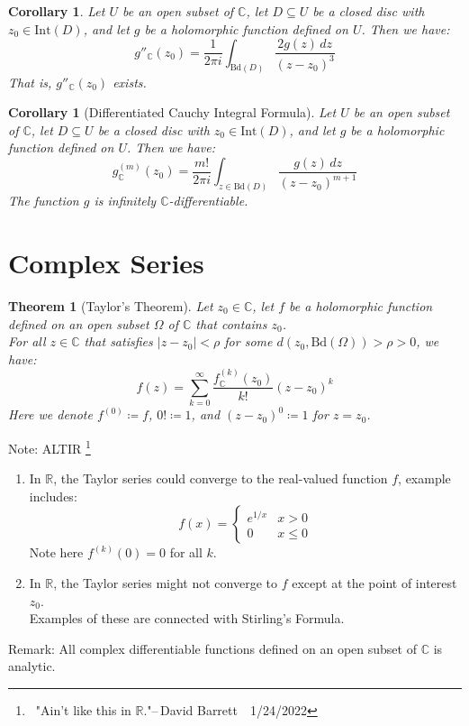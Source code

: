 \documentclass[11pt,oneside]{book}
\theoremstyle{break}
\theoremstyle{break}
\newtheorem{thm}{Theorem}[section]
\newtheorem{corT}[lem]{Corollary}
\newcommand{\R}{\mathbb{R}}
\newcommand{\Complex}{\mathbb{C}}
\newcommand{\Int}{\text{Int}}
\newcommand{\Bd}{\text{Bd}}
\newcommand{\note}{\color{red}Note: \color{black}}
\newcommand{\remark}{\color{blue}Remark: \color{black}}
\begin{document}
\begin{corT}
Let $U$ be an open subset of $\Complex$, let $D\subseteq U$ be a closed disc with $z_0 \in \Int(D)$, and let $g$ be a holomorphic function defined on $U$. Then we have: 
$$g''_{\Complex}(z_0) = \frac{1}{2\pi i}\int_{\Bd(D)} \frac{2g(z)\, dz}{(z-z_0)^3}$$ 
That is, $g''_{\Complex}(z_0)$ exists.
\end{corT}

\begin{corT}[Differentiated Cauchy Integral Formula]
Let $U$ be an open subset of $\Complex$, let $D\subseteq U$ be a closed disc with $z_0 \in \Int(D)$, and let $g$ be a holomorphic function defined on $U$. Then we have:
$$g^{(m)}_{\Complex}(z_0) = \frac{m!}{2\pi i}\int_{z\in \Bd(D)}\frac{g(z)\, dz}{(z-z_0)^{m+1}}$$
The function $g$ is infinitely $\Complex$-differentiable.
\end{corT}

\newpage
\section[Complex Series]{\color{red} Complex Series \color{black}}
\begin{thm}[Taylor's Theorem]
Let $z_0 \in \Complex$, let $f$ be a holomorphic function defined on an open subset $\Omega$ of $\Complex$ that contains $z_0$. \\For all $z \in \Complex$ that satisfies $|z-z_0|<\rho$ for some $d(z_0, \Bd(\Omega))>\rho >0$, we have:
$$f(z) = \sum_{k=0}^\infty \frac{f^{(k)}_{\Complex}(z_0)}{k!}(z-z_0)^k$$
Here we denote $f^{(0)} \coloneqq f$, $0!\coloneqq 1$, and $(z-z_0)^0 \coloneqq 1$ for $z= z_0$. 
\end{thm}

\note ALTIR \footnote{\ "Ain't like this in $\R$."\hfill --\,David Barrett\ \ 1/24/2022}
\begin{enumerate}[topsep=3pt,itemsep=-1ex,partopsep=1ex,parsep=1ex]
\item In $\R$, the Taylor series could converge to the real-valued function $f$, example includes: $$f(x) = \begin{cases}e^{1/x} & x>0 \\ 0 & x\leq 0 \end{cases}$$ Note here $f^{(k)}(0) = 0$ for all $k$.
\item In $\R$, the Taylor series might not converge to $f$ except at the point of interest $z_0$. \\
Examples of these are connected with Stirling's Formula.  
\end{enumerate}
\remark All complex differentiable functions defined on an open subset of $\Complex$ is analytic.\\
\end{document}
